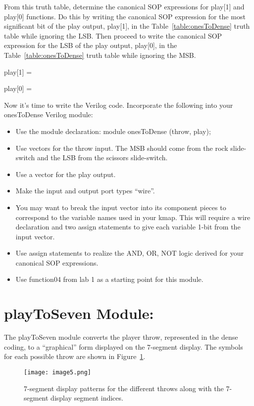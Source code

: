 From this truth table, determine the canonical SOP expressions for
play{[}1{]} and play{[}0{]} functions. Do this by writing the canonical
SOP expression for the most significant bit of the play output,
play{[}1{]}, in the Table~\ref{table:onesToDense} truth table while ignoring the LSB. Then
proceed to write the canonical SOP expression for the LSB of the play
output, play{[}0{]}, in the Table~\ref{table:onesToDense} truth table while ignoring the MSB.

\protect\hypertarget{ones2Dense_CanonicalSOP}{}{}play{[}1{]} =

play{[}0{]} =

\protect\hypertarget{ones2Dense_Verilog}{}{}Now it's time to write the
Verilog code. Incorporate the following into your onesToDense Verilog
module:

\begin{itemize}
\item
  Use the module declaration: module onesToDense (throw, play);
\item
  Use vectors for the throw input. The MSB should come from the rock
  slide-switch and the LSB from the scissors slide-switch.
\item
  Use a vector for the play output.
\item
  Make the input and output port types ``wire''.
\item
  You may want to break the input vector into its component pieces to
  correspond to the variable names used in your kmap. This will require
  a wire declaration and two assign statements to give each variable
  1-bit from the input vector.
\item
  Use assign statements to realize the AND, OR, NOT logic derived for
  your canonical SOP expressions.
\item
  Use function04 from lab 1 as a starting point for this module.
\end{itemize}

\hypertarget{playtoseven-module}{%
\section{playToSeven Module:}
\label{playtoseven-module}}

The playToSeven module converts the player throw, represented in the
dense coding, to a ``graphical'' form displayed on the 7-segment
display. The symbols for each possible throw are shown in Figure~\ref{figure:throw7seg}.

\begin{figure}[ht]
\texttt{[image:  image5.png]}
\caption{7-segment display patterns for the different throws along with
the 7-segment display segment indices.}
\label{figure:throw7seg}
\end{figure}

